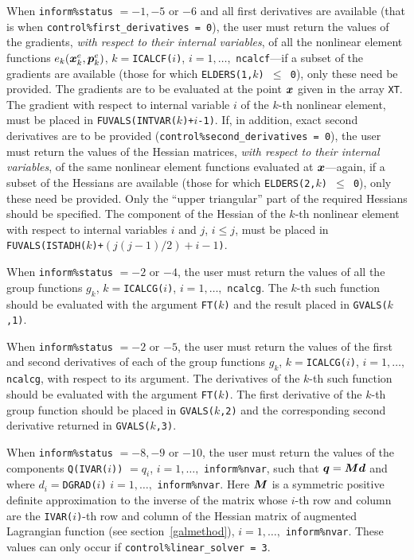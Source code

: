 \documentclass{galahad}
\begin{document}
When {\tt inform\%status} $= -1, -5$ or $-6$
and all first derivatives are available
(that is when {\tt control\%first\_der\-ivat\-ives = 0}),
the user must return the values
of the gradients, {\em with respect to their internal variables}, of all
the nonlinear element functions
$e_k({\bm{x}}^e_k,{\bm{p}}^e_k)$,
$k = ${\tt  ICALCF($i$)}, $i=1,  \ldots,$ {\tt ncalcf}---if a subset of the
gradients are available (those for which {\tt ELDERS(1,$k$) $\leq$ 0}),
only these need be provided.
The gradients are to be evaluated at the point  ${\bm{x}}$ given in
the array  {\tt XT}.  The  gradient with respect  to internal variable
$i$ of the $k$-th nonlinear element,
must be placed in {\tt FUVALS(INTVAR($k$)+$i$-1)}.
If, in addition, exact second derivatives
are to be provided
({\tt control\%se\-cond\_derivatives = 0}), the user must return the values
of the Hessian matrices, {\em with respect to their internal variables},
of the same nonlinear element functions
evaluated at ${\bm{x}}$---again, if a subset of the
Hessians are available (those for which {\tt ELDERS(2,$k$) $\leq$ 0}),
only these need be provided.
Only the ``upper triangular'' part of the
required Hessians should be specified.
The component of the Hessian of the $k$-th nonlinear element
with respect to internal variables
$i$ and $j$, $i \leq j$,
must be  placed in {\tt FUVALS(ISTADH($k$)+$(j(j-1)/2)+i-1$)}.

When {\tt inform\%status} $ = -2$ or $- 4$, the user must return the values
of all the group functions
$g_k$, $k  = ${\tt ICALCG($i$)},   $i=1,  \ldots,$ {\tt ncalcg}.   The
$k$-th such  function  should  be  evaluated  with the argument
{\tt FT($k$)} and the result placed in {\tt GVALS($k$,1)}.

When {\tt inform\%status} $= -2$ or $-5$, the user must return the values
of the first and second derivatives of each of
the group functions
$g_k$, $k =  ${\tt   ICALCG($i$)}, $i=1, \ldots,$ {\tt  ncalcg},  with
respect to its argument.  The derivatives of the  $k$-th such function
should be  evaluated with   the   argument  {\tt FT($k$)}.  The  first
derivative
of the $k$-th group function should be placed in {\tt GVALS($k$,2)} and the
corresponding second derivative returned in {\tt GVALS($k$,3)}.

When {\tt inform\%status} $= -8, -9$ or $- 10$, the user must return the
values of the components {\tt Q(IVAR($i$))}
$= q_i$, $i = 1, \ldots,$ {\tt inform\%nvar}, such
that ${\bm{q}}={\bm{M}} {\bm{d}}$ and where $d_i=${\tt DGRAD($i$)} $i=1, \ldots,$
{\tt inform\%nvar}. Here ${\bm{M}}$ is a symmetric positive definite
approximation to the inverse of the matrix
whose $i$-th row and column are the
{\tt IVAR($i$)}-th row and column
of the Hessian matrix of augmented Lagrangian function (see
section~\ref{galmethod}),
$i = 1, \ldots,$ {\tt inform\%nvar}.
These values can only occur if {\tt control\%linear\_solver = 3}.
\end{document}
